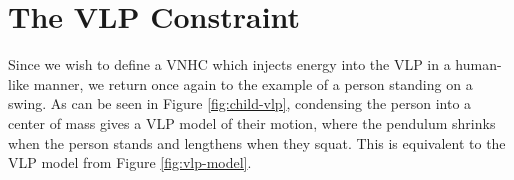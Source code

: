 
\section{The VLP Constraint}
Since we wish to define a VNHC which injects energy into the VLP in a human-like
manner,
we return once again to the example of a person standing on a swing.
As can be seen in Figure \ref{fig:child-vlp}, condensing the person 
into a center of mass gives a VLP model of their motion, where
the pendulum shrinks when the person stands and lengthens when they squat. This
is equivalent to the VLP model from Figure \ref{fig:vlp-model}.
